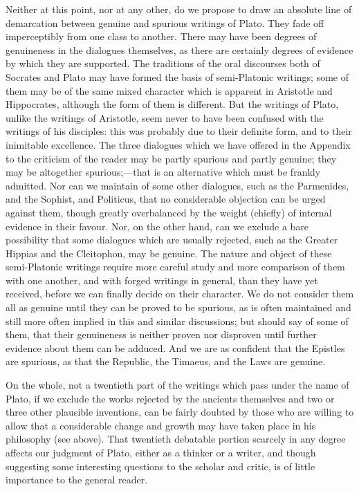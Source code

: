\documentclass[11pt,letter]{article}
\begin{document}
\par  Neither at this point, nor at any other, do we propose to draw an absolute line of demarcation between genuine and spurious writings of Plato. They fade off imperceptibly from one class to another. There may have been degrees of genuineness in the dialogues themselves, as there are certainly degrees of evidence by which they are supported. The traditions of the oral discourses both of Socrates and Plato may have formed the basis of semi-Platonic writings; some of them may be of the same mixed character which is apparent in Aristotle and Hippocrates, although the form of them is different. But the writings of Plato, unlike the writings of Aristotle, seem never to have been confused with the writings of his disciples: this was probably due to their definite form, and to their inimitable excellence. The three dialogues which we have offered in the Appendix to the criticism of the reader may be partly spurious and partly genuine; they may be altogether spurious;—that is an alternative which must be frankly admitted. Nor can we maintain of some other dialogues, such as the Parmenides, and the Sophist, and Politicus, that no considerable objection can be urged against them, though greatly overbalanced by the weight (chiefly) of internal evidence in their favour. Nor, on the other hand, can we exclude a bare possibility that some dialogues which are usually rejected, such as the Greater Hippias and the Cleitophon, may be genuine. The nature and object of these semi-Platonic writings require more careful study and more comparison of them with one another, and with forged writings in general, than they have yet received, before we can finally decide on their character. We do not consider them all as genuine until they can be proved to be spurious, as is often maintained and still more often implied in this and similar discussions; but should say of some of them, that their genuineness is neither proven nor disproven until further evidence about them can be adduced. And we are as confident that the Epistles are spurious, as that the Republic, the Timaeus, and the Laws are genuine.

\par  On the whole, not a twentieth part of the writings which pass under the name of Plato, if we exclude the works rejected by the ancients themselves and two or three other plausible inventions, can be fairly doubted by those who are willing to allow that a considerable change and growth may have taken place in his philosophy (see above). That twentieth debatable portion scarcely in any degree affects our judgment of Plato, either as a thinker or a writer, and though suggesting some interesting questions to the scholar and critic, is of little importance to the general reader.
\end{document}
